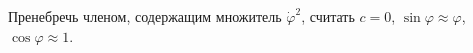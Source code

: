 Пренебречь членом, содержащим множитель $\dot{\varphi}^2$,
считать $c = 0$, $\sin{\varphi} \approx  \varphi$, $\cos{\varphi} \approx 1$.
